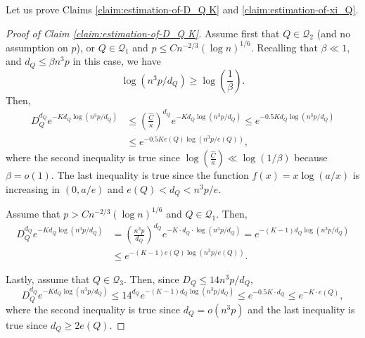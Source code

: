 \documentclass[11pt,a4paper,oneside,reqno]{amsart}
\newcommand{\cQ}{\mathcal{Q}}
\newcommand{\1}{\mathbbm{1}} %
\renewcommand{\le}{\leqslant}
\renewcommand{\ge}{\geqslant}
\begin{document}
Let us prove Claims \ref{claim:estimation-of-D_Q K} and \ref{claim:estimation-of-xi_Q}.
\begin{proof}[Proof of Claim \ref{claim:estimation-of-D_Q K}]
    Assume first that $Q \in \cQ_2$ (and no assumption on $p$), or $Q \in \cQ_1$ and $p \le C n^{-2/3} \left(\log n\right)^{1/6}$. Recalling that $\beta \ll 1$, and $d_Q \le \beta n^3 p$ in this case, we have
    \[
        \log(n^3 p / d_Q) \ge \log\left(\frac{1}{\beta}\right).
    \]
    Then,
    \begin{align*}
        D_Q^{d_Q} e^{-K d_Q \log(n^3 p / d_Q)} &\le \left(\frac{\hat{C}}{\kappa}\right)^{d_Q} e^{-K d_Q \log(n^3 p / d_Q)} \le e^{-0.5 K d_Q \log(n^3 p / d_Q)} \\&\le e^{-0.5K e(Q) \log(n^3 p / e(Q))},
    \end{align*}
    where the second inequality is true since $\log\left(\frac{\hat{C}}{\kappa}\right) \ll \log(1/\beta)$ because $\beta = o(1)$. The last inequality is true since the function $f(x) = x \log (a/x)$ is increasing in $(0, a/e)$ and $e(Q) < d_Q < n^3 p / e$.

    Assume that $p > C n^{-2/3} \left(\log n\right)^{1/6}$ and $Q \in \cQ_1$. Then, 
    \begin{align*}
        D_Q^{d_Q} e^{-K d_Q \log(n^3 p / d_Q)} &= \left(\frac{n^3 p}{d_Q}\right)^{d_Q} e^{-K \cdot d_Q\cdot  \log(n^3 p / d_Q)} = e^{-(K-1) d_Q \log(n^3 p / d_Q)} \\&\le e^{-(K-1) e(Q) \log(n^3 p / e(Q))}.
    \end{align*}

    Lastly, assume that $Q \in \cQ_3$. Then, since $D_Q \le 14 n^3 p / d_Q$,
    \[
        D_Q^{d_Q} e^{-K d_Q \log(n^3 p / d_Q)} \le 14^{d_Q} e^{-(K-1) d_Q \log(n^3 p / d_Q)} \le e^{-0.5 K \cdot d_Q} \le e^{-K \cdot e(Q)},
    \]
    where the second inequality is true since $d_Q = o(n^3 p)$ and the last inequality is true since $d_Q \ge 2 e(Q)$.
\end{proof}
\end{document}
